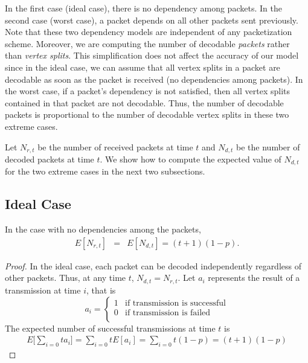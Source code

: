     In the first case (ideal
    case), there is no dependency among packets.
    In the second case (worst case), a packet depends on all other packets
    sent previously.  Note that these two dependency models are
    independent of any packetization scheme.
    Moreover, we are computing the number of decodable \textit{packets} rather
    than \textit{vertex splits}.  This simplification does not affect
    the accuracy of our model
    since in the ideal case, we can assume that all vertex splits
    in a packet are decodable as soon as the packet is received (no dependencies
    among packets).  In the worst case, if a packet's dependency is not
    satisfied, then all vertex splits contained in that packet are
    not decodable.  Thus, the number of decodable packets is
    proportional to the number of decodable vertex splits in these two extreme
    cases.

    Let $N_{r,t}$ be the number of received packets at time $t$ and
    $N_{d,t}$ be the number of decoded packets at time $t$.   We show
    how to compute the expected value of $N_{d,t}$ for the two
    extreme cases in the next two subsections.

\subsection{Ideal Case}
\begin{theorem}
\label{t:model:ideal}
    In the case with no dependencies among the packets,
    \begin{eqnarray*}
    E[N_{r,t}] &=& E[N_{d,t}] = (t+1)(1-p).
    \end{eqnarray*}
\end{theorem}
    \begin{proof}
    In the ideal case, each packet can be decoded independently
    regardless of other packets.  Thus, at any time $t$,
    $N_{d,t} = N_{r,t}$.
    Let $a_i$ represents the result of a transmission at time $i$,  
    that is
    \begin{displaymath}
    a_i = \left\{\begin{array}{ll}
    1 & \textrm{if transmission is successful}\\
    0 & \textrm{if transmission is failed}\\
    \end{array}\right.
    \end{displaymath}
    The expected number of successful transmissions at time $t$ is
    \begin{eqnarray*}
    E\big[\sum_{i=0}{t}a_i\big] = \sum_{i=0}{t}E[a_i] = \sum_{i=0}{t}(1-p) = (t+1)(1-p)
    \end{eqnarray*}
    \end{proof}

